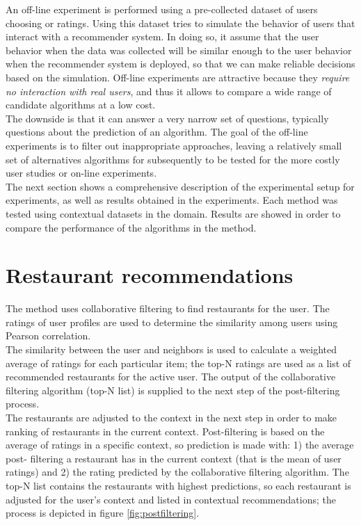 An off-line experiment is performed using a pre-collected dataset
of users choosing or ratings. Using this dataset tries to simulate
the behavior of users that interact with a recommender system. In
doing so, it assume that the user behavior when the data was collected
will be similar enough to the user behavior when the recommender
system is deployed, so that we can make reliable decisions based on
the simulation.  Off-line experiments are attractive because they
\textit{require no interaction with real users}, and thus it allows to compare
a wide range of candidate algorithms at a low cost. \\ The downside is
that it can answer a very narrow set of questions, typically questions
about the prediction of an algorithm. The goal of the off-line
experiments is to filter out inappropriate  approaches, leaving a
relatively small set of alternatives algorithms for subsequently to be
tested for the more costly user studies or on-line 
experiments\cite{adomavicius2011context}.\\ 
The next section shows a comprehensive description of the 
experimental setup for experiments, as well as results obtained 
in the experiments.
Each method was tested using contextual datasets in the domain. 
Results are showed in order to  compare the performance of the 
algorithms in the method. 
\section{Restaurant recommendations} 

The method uses collaborative filtering to find restaurants for the
user\cite{ramirez2013restaurant}. The ratings of user profiles are
used to determine the similarity among users using Pearson
correlation.\\ The similarity between the user and  neighbors is
used to calculate a weighted average of ratings for each particular
item;  the top-N ratings are used as a list of recommended restaurants
for the active user. The output of the collaborative filtering
algorithm (top-N list) is supplied to the next step of the 
post-filtering process. \\The restaurants are adjusted to the context in
the next step in order to make ranking of restaurants in the current
context. Post-filtering is based on the average of ratings in a
specific context, so prediction is made with: 1) the average post-
filtering a restaurant has in the current context (that is the mean of
user ratings) and 2) the rating predicted by the collaborative
filtering algorithm. The top-N list contains the restaurants with
highest predictions, so each restaurant is adjusted for the user’s
context and listed in contextual recommendations; the process is
depicted in figure \ref{fig:postfiltering}.

